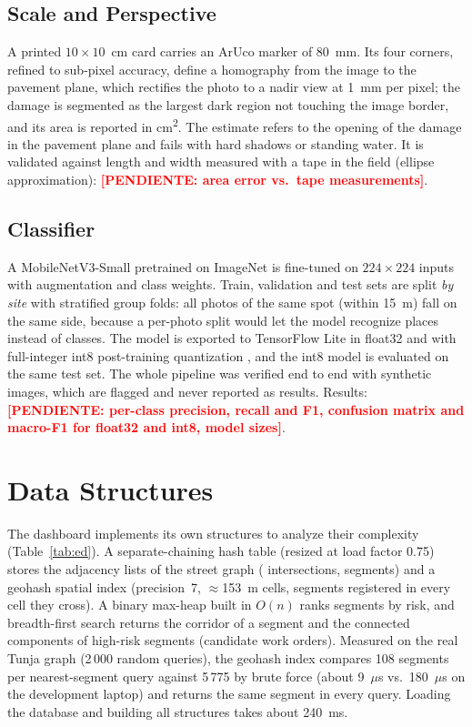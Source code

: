 \documentclass[journal,10pt]{IEEEtran}
\newcommand{\pendiente}[1]{\textcolor{red}{\textbf{[PENDIENTE: #1]}}}
\begin{document}
\subsection{Scale and Perspective}
A printed \(10\times10\)~cm card carries an ArUco marker \cite{garrido2014aruco} of 80~mm. Its four corners, refined to sub-pixel accuracy, define a homography \cite{hartley2004mvg} from the image to the pavement plane, which rectifies the photo to a nadir view at 1~mm per pixel; the damage is segmented as the largest dark region not touching the image border, and its area is reported in cm\textsuperscript{2}. The estimate refers to the opening of the damage in the pavement plane and fails with hard shadows or standing water. It is validated against length and width measured with a tape in the field (ellipse approximation): \pendiente{area error vs.\ tape measurements}.

\subsection{Classifier}
A MobileNetV3-Small \cite{howard2019mobilenetv3} pretrained on ImageNet is fine-tuned on \(224\times224\) inputs with augmentation and class weights. Train, validation and test sets are split \emph{by site} with stratified group folds: all photos of the same spot (within 15~m) fall on the same side, because a per-photo split would let the model recognize places instead of classes. The model is exported to TensorFlow Lite in float32 and with full-integer int8 post-training quantization \cite{jacob2018quant}, and the int8 model is evaluated on the same test set. The whole pipeline was verified end to end with synthetic images, which are flagged and never reported as results. Results: \pendiente{per-class precision, recall and F1, confusion matrix and macro-F1 for float32 and int8, model sizes}.

\section{Data Structures}
The dashboard implements its own structures to analyze their complexity (Table~\ref{tab:ed}). A separate-chaining hash table (resized at load factor 0.75) stores the adjacency lists of the street graph (\NNodos{} intersections, \NTramos{} segments) and a geohash spatial index (precision~7, \(\approx\)153~m cells, segments registered in every cell they cross). A binary max-heap built in \(O(n)\) ranks segments by risk, and breadth-first search returns the corridor of a segment and the connected components of high-risk segments (candidate work orders). Measured on the real Tunja graph (2\,000 random queries), the geohash index compares 108 segments per nearest-segment query against 5\,775 by brute force (about 9~\(\mu\)s vs.\ 180~\(\mu\)s on the development laptop) and returns the same segment in every query. Loading the database and building all structures takes about 240~ms.
\end{document}
